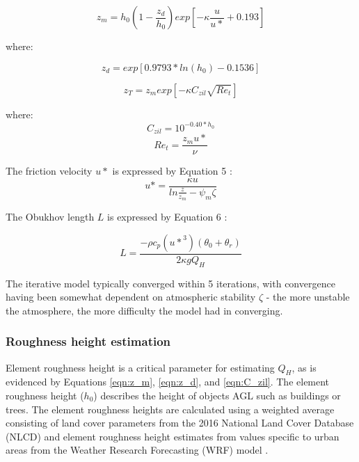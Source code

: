 \begin{equation}
    z_m = h_0 (1-\frac{z_d}{h_0}) exp[-\kappa \frac{u}{u*} + 0.193]
    \label{eqn:z_m}
\end{equation}

where:

\begin{equation}
    z_d = exp[0.9793 * ln(h_0) - 0.1536]
    \label{eqn:z_d}
\end{equation}

\begin{equation}
    z_T = z_m exp[-\kappa C_{zil} \sqrt{Re_t}]
    \label{eqn:z_T}
\end{equation}

where:
\begin{equation}
    C_{zil} = 10^{-0.40*h_0}
    \label{eqn:C_zil}
\end{equation}
\begin{equation}
    Re_t = \frac{z_m u*}{\nu}
    \label{eqn:Re_t}
\end{equation}

The friction velocity $u*$ is expressed by Equation 5 \citep{Monin_1954}:
\begin{equation}
    u* = \frac{\kappa u}{ln\frac{z}{z_m} - \psi_m \zeta}
    \label{eqn:u*}
\end{equation}

The Obukhov length $L$ is expressed by Equation 6 \citep{Monin_1954}:

\begin{equation}
    L = \frac{-\rho c_p ({u*}^3) (\theta_0 + \theta_r)}{2 \kappa g Q_H}
    \label{eqn:L}
\end{equation}

The iterative model typically converged within 5 iterations, with convergence having been somewhat dependent on atmospheric stability $\zeta$ - the more unstable the atmosphere, the more difficulty the model had in converging.


\subsubsection{Roughness height estimation} \label{methodology-roughness-height}
Element roughness height is a critical parameter for estimating $Q_H$, as is evidenced by Equations \ref{eqn:z_m},  \ref{eqn:z_d},  and \ref{eqn:C_zil}. The element roughness height ($h_0$) describes the height of objects AGL such as buildings or trees.  The element roughness heights are calculated using a weighted average consisting of land cover parameters from the 2016 National Land Cover Database (NLCD) \citep{Yang_2018} and element roughness height estimates from values specific to urban areas from the Weather Research Forecasting (WRF) model \citep{Chen_2011, Skamarock_2008}. 

